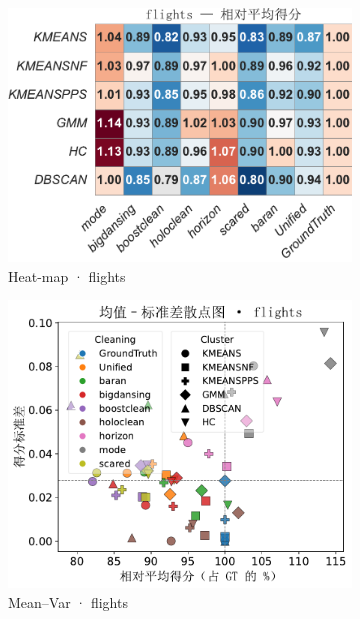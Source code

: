 \documentclass[10pt]{article} %
\numberwithin{equation}{section}
\begin{document}
\begin{figure}[htbp]
  \vspace{0.6em}
  \begin{subfigure}{0.33\linewidth}
    \centering
    \includegraphics[width=\linewidth]{figures/5.3.1graph/heatmap_rel_flights.pdf}
    \caption{Heat-map · flights}
  \end{subfigure}\hfill
  \begin{subfigure}{0.32\linewidth}
    \centering
    \includegraphics[width=\linewidth]{figures/5.3.1graph/mean_sd_scatter_flights.pdf}
    \caption{Mean–Var · flights}
  \end{subfigure}\hfill
  \begin{subfigure}{0.34\linewidth}

\end{subfigure}
\end{figure}
\end{document}
